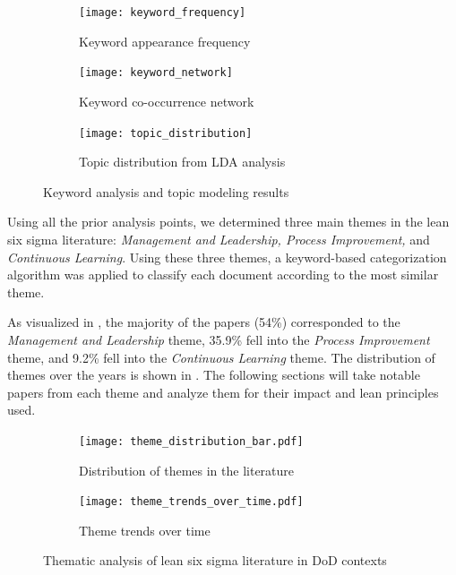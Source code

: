 \documentclass{article}
\begin{document}
		\begin{figure}[htbp]
			\centering
			\begin{subfigure}[b]{0.32\textwidth}
				\centering
				\texttt{[image: keyword\_frequency]}
				\caption{Keyword appearance frequency}
				\label{fig:keyword_freq}
			\end{subfigure}
			\hfill
			\begin{subfigure}[b]{0.32\textwidth}
				\centering
				\texttt{[image: keyword\_network]}
				\caption{Keyword co-occurrence network}
				\label{fig:keyword_network}
			\end{subfigure}
			\hfill
			\begin{subfigure}[b]{0.32\textwidth}
				\centering
				\texttt{[image: topic\_distribution]}
				\caption{Topic distribution from LDA analysis}
				\label{fig:topics}
			\end{subfigure}
			\caption{Keyword analysis and topic modeling results}
			\label{fig:keyword_analysis}
		\end{figure}

		Using all the prior analysis points, we determined three main themes in the lean six sigma literature: \textit{Management and Leadership, Process Improvement,} and \textit{Continuous Learning}. 
		Using these three themes, a keyword-based categorization algorithm was applied to classify each document according to the most similar theme.

		As visualized in , the majority of the papers (54\%) corresponded to the \textit{Management and Leadership} theme, 35.9\% fell into the \textit{Process Improvement} theme, and 9.2\% fell into the \textit{Continuous Learning} theme.
		The distribution of themes over the years is shown in .
		The following sections will take notable papers from each theme and analyze them for their impact and lean principles used.

		\begin{figure}[htbp]
			\centering
			\begin{subfigure}[b]{0.48\textwidth}
				\centering
				\texttt{[image: theme\_distribution\_bar.pdf]}
				\caption{Distribution of themes in the literature}
				\label{fig:theme_distribution_bar}
			\end{subfigure}
			\hfill
			\begin{subfigure}[b]{0.48\textwidth}
				\centering
				\texttt{[image: theme\_trends\_over\_time.pdf]}
				\caption{Theme trends over time}
				\label{fig:theme_trends}
			\end{subfigure}
			\caption{Thematic analysis of lean six sigma literature in DoD contexts}
			\label{fig:theme_analysis}
		\end{figure}
\end{document}
